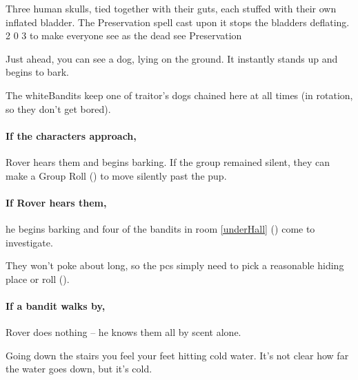   {Three human skulls, tied together with their guts, each stuffed with their own inflated bladder.
  The Preservation spell cast upon it stops the bladders deflating.}%
  {2}%
  {0}%
  {3}%
  {to make everyone see as the dead see}%
  {Preservation}%
  {
    \setcounter{Fate}{2}
    \setcounter{Air}{2}
    \setcounter{Water}{1}
    \setcounter{Vigilance}{1}
    \setcounter{Academics}{1}
  }%


\begin{boxtext}
  Just ahead, you can see a dog, lying on the ground.
  It instantly stands up and begins to bark.
\end{boxtext}


\begin{exampletext}
  The \gls{whiteBandits} keep one of \gls{traitor}'s dogs chained here at all times (in rotation, so they don't get bored).
\end{exampletext}

\paragraph{If the characters approach,}
Rover hears them and begins barking.
If the group remained silent, they can make a  Group Roll (\tn[9]) to move silently past the pup.

\paragraph{If Rover hears them,}
he begins barking and four of the bandits in room \ref{underHall} () come to investigate.

They won't poke about long, so the \glspl{pc} simply need to pick a reasonable hiding place or roll  (\tn[8]).

\paragraph{If a bandit walks by,}
Rover does nothing -- he knows them all by scent alone.


\begin{boxtext}
  Going down the stairs you feel your feet hitting cold water.
  It's not clear how far the water goes down, but it's cold.
\end{boxtext}

